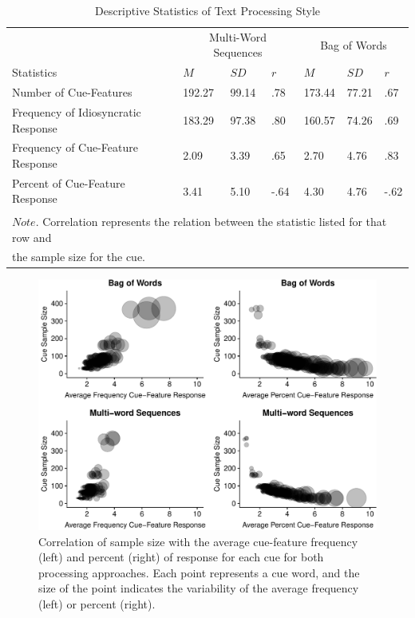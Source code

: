 \documentclass[man]{apa6}
\begin{document}
\begin{table}[t]

\caption{\label{tab:tab6}Descriptive Statistics of Text Processing Style}
\centering
\begin{tabular}{lllllll}
\toprule
\multicolumn{1}{c}{ } & \multicolumn{3}{c}{Multi-Word Sequences} & \multicolumn{3}{c}{Bag of Words} \\
\cmidrule(l{3pt}r{3pt}){2-4} \cmidrule(l{3pt}r{3pt}){5-7}
Statistics & $M$ & $SD$ & $r$ & $M$ & $SD$ & $r$\\
\midrule
Number of Cue-Features & 192.27 & 99.14 & .78 & 173.44 & 77.21 & .67\\
Frequency of Idiosyncratic Response & 183.29 & 97.38 & .80 & 160.57 & 74.26 & .69\\
Frequency of Cue-Feature Response & 2.09 & 3.39 & .65 & 2.70 & 4.76 & .83\\
Percent of Cue-Feature Response & 3.41 & 5.10 & -.64 & 4.30 & 4.76 & -.62\\
\bottomrule
\multicolumn{7}{l}{\textsuperscript{} $Note$. Correlation represents the relation between the statistic listed for that row and}\\
\multicolumn{7}{l}{the sample size for the cue.}\\
\end{tabular}
\end{table}

\begin{figure}
\centering
\includegraphics{flt_manuscript_files/figure-latex/correlation-fig-1.pdf}
\caption{\label{fig:correlation-fig}Correlation of sample size with the average cue-feature frequency (left) and percent (right) of response for each cue for both processing approaches. Each point represents a cue word, and the size of the point indicates the variability of the average frequency (left) or percent (right).}
\end{figure}
\end{document}
